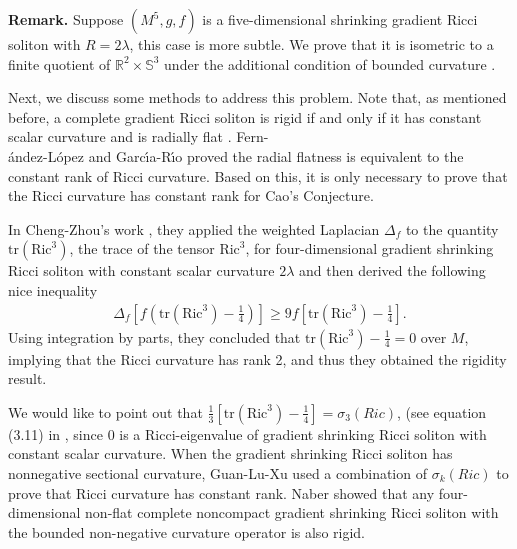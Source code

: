 \documentclass[12pt]{amsart}
\newcommand{\ban}{\begin{eqnarray*}}
\newcommand{\ean}{\end{eqnarray*}}
\newtheorem{theo}{Theorem}[section]
\begin{document}
	

\textbf{Remark.}
Suppose $(M^5, g, f)$ is a five-dimensional shrinking gradient Ricci soliton with $R=2\lambda$,
this case is more subtle. We prove that it is isometric to a finite quotient of $\mathbb{R}^2 \times \mathbb{S}^3$ under the additional condition of bounded curvature \cite{Li-Ou-Qu-Wu}.

\medskip	
	
	
	
	Next, we discuss some methods to address this problem.
	Note that, as mentioned before, a complete gradient Ricci soliton is rigid if and only if it has constant scalar curvature and is radially flat \cite{Petersen-Wylie}. Fern-\\\'{a}ndez-L\'{o}pez and Garc\'\i a-R\'\i o  \cite{FR16}  proved the radial flatness is equivalent to the constant rank of Ricci curvature.
	Based on this, it is only necessary to prove that the Ricci curvature has constant rank for Cao's Conjecture.
	
	\smallskip	
In Cheng-Zhou's work \cite{Cheng-Zhou}, 	they applied the weighted Laplacian $\Delta_f$ to the quantity $\textrm{tr}(\text{Ric}^3)$, the trace of the tensor $\textrm{Ric}^3$, for four-dimensional gradient shrinking Ricci soliton with constant scalar curvature $2\lambda$ and then derived the following nice inequality
	\ban
	\Delta_f  \left[ f(\textrm{tr}(\text{Ric}^3)-\frac14)\right] \geq 9 f\left[ \textrm{tr}(\text{Ric}^3)-\frac14\right].
	\ean
	Using integration by parts, they concluded that $\textrm{tr}(\text{Ric}^3)-\frac14=0$
	over $M$, %
	implying that the Ricci curvature has rank 2, and thus they obtained the rigidity result.
	
	\smallskip	
	We would like to point out that $\frac{1}{3}\left[ \textrm{tr}(\text{Ric}^3)-\frac14\right]=\sigma_3(Ric)$,
	(see equation (3.11) in \cite{Cheng-Zhou},
	since 0 is a Ricci-eigenvalue of gradient shrinking Ricci soliton with constant scalar curvature.
	When the gradient shrinking Ricci soliton has nonnegative sectional curvature,
	Guan-Lu-Xu  \cite{GLX15}  used a combination of $\sigma_k(Ric)$ to prove that Ricci curvature has constant rank.
	Naber \cite{Naber} showed that any four-dimensional non-flat complete noncompact gradient shrinking Ricci soliton
	with the bounded non-negative curvature operator is also rigid.
	\smallskip
	
\end{document}
